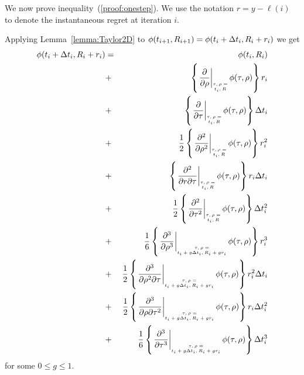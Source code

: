 \documentclass{article}[12pt]
\begin{document}
We now prove inequality~(\ref{proof:onestep}). 
We use the notation $r=y -\ell(i)$ to denote the instantaneous regret at iteration $i$. 


Applying Lemma~\ref{lemma:Taylor2D} to
$\phi(t_{i+1},R_{i+1})=\phi(t_i+\Delta t_i,R_i+r_i)$  we get
\begin{eqnarray} 
    \pot(t_i+\deltat_i,\R_i+r_i) & =&  
    \pot(t_i,\R_i)\\
    &+&\at{\frac{\partial}{\partial \rho}} r_i \\
    &+&\at{\frac{\partial}{\partial \tau}}  \deltat_i \\
    &+& \frac{1}{2} \at{\frac{\partial^2}{\partial \rho^2}} r_i^2 \\
    &+& \at{\frac{\partial^2}{\partial r \partial \tau}} r_i \deltat_i \label{term:Taylor_rdt}\\
    &+& \frac{1}{2} \at{\frac{\partial^2}{\partial \tau^2}} \deltat_i^2 \label{term:Taylor_dtsquare}\\
    &+& \frac{1}{6} \att{\frac{\partial^3}{\partial \rho^3}} r_i^3 \label{term:Taylor_r3}\\
    &+& \frac{1}{2} \att{\frac{\partial^3}{\partial \rho^2 \partial \tau}} r_i^2\deltat_i \label{term:Taylor_r2t}\\
    &+& \frac{1}{2} \att{\frac{\partial^3}{\partial \rho \partial \tau^2}} r_i\deltat_i^2 \label{term:Taylor_rt2}\\
    &+& \frac{1}{6} \att{\frac{\partial^3}{\partial \tau^3}} \deltat_i^3 \label{term:Taylor_t3}
\end{eqnarray}
for some $0 \leq g \leq 1$.
\end{document}
